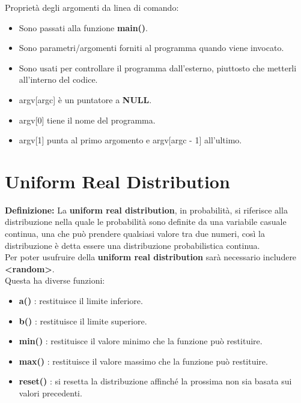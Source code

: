\textsf{\small Proprietà degli argomenti da linea di comando: } \\

\begin{itemize}
	\item \textsf{\small Sono passati alla funzione \textbf{main()}.}
	\item \textsf{\small Sono parametri/argomenti forniti al programma quando viene invocato.}
	\item \textsf{\small Sono usati per controllare il programma dall'esterno, piuttosto che metterli all'interno del codice.}
	\item \textsf{\small argv[argc] è un puntatore a \textbf{NULL}.}
	\item \textsf{\small argv[0] tiene il nome del programma.}
	\item \textsf{\small argv[1] punta al primo argomento e argv[argc - 1] all'ultimo.}
\end{itemize}


\newpage

\section{Uniform Real Distribution}

\textsf{\small \textbf{Definizione: } La \textbf{uniform real distribution}, in probabilità, si riferisce alla distribuzione nella quale le probabilità sono definite da una variabile casuale continua, una che può prendere qualsiasi valore tra due numeri, così la distribuzione è detta essere una distribuzione probabilistica continua. } \\

\textsf{\small Per poter usufruire della \textbf{uniform real distribution} sarà necessario includere \textbf{<random>}.} \\ 

\textsf{\small Questa ha diverse funzioni: } \\

\begin{itemize}
	\item \textsf{\small \textbf{a()} : restituisce il limite inferiore.}
	\item \textsf{\small \textbf{b()} : restituisce il limite superiore.}
	\item \textsf{\small \textbf{min()} : restituisce il valore minimo che la funzione può restituire.}
	\item \textsf{\small \textbf{max()} : restituisce il valore massimo che la funzione può restituire.}
	\item \textsf{\small \textbf{reset()} : si resetta la distribuzione affinché la prossima non sia basata sui valori precedenti.}
\end{itemize}


